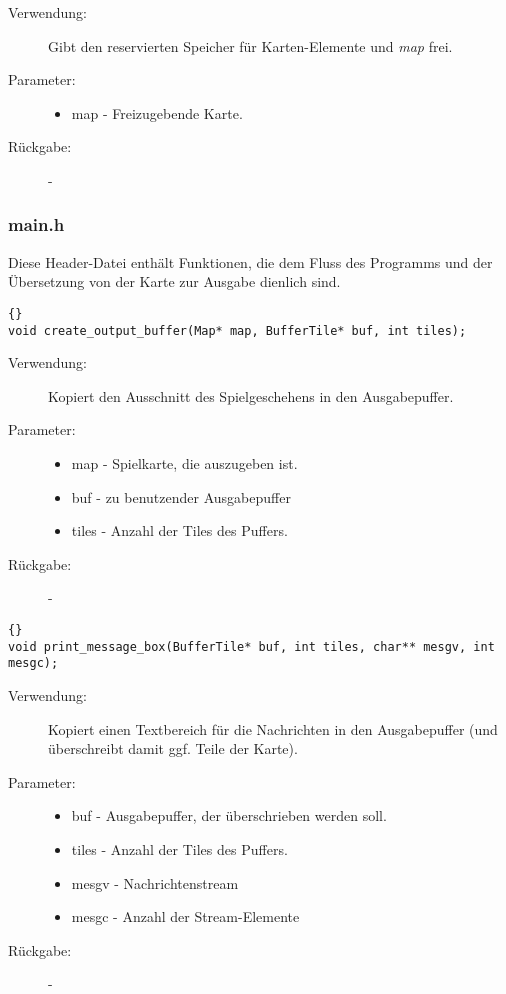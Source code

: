 \documentclass[11pt,a4paper,notitlepage]{report}
\begin{document}
	\begin{description}
		\item[Verwendung:] Gibt den reservierten Speicher für Karten-Elemente und \textit{map} frei.
		\item[Parameter:] \hfill
		\begin{itemize}
			\item map - Freizugebende Karte.
		\end{itemize}
		\item[Rückgabe:] -
	\end{description}
	
	\newpage
	\subsubsection*{main.h}
	Diese Header-Datei enthält Funktionen, die dem Fluss des Programms und der Übersetzung von der Karte zur Ausgabe dienlich sind.
	
		\begin{lstlisting}[caption=create\_output\_buffer]{}
void create_output_buffer(Map* map, BufferTile* buf, int tiles);
		\end{lstlisting}
		
	\begin{description}
		\item[Verwendung:] Kopiert den Ausschnitt des Spielgeschehens in den Ausgabepuffer.
		\item[Parameter:] \hfill
		\begin{itemize}
			\item map - Spielkarte, die auszugeben ist.
			\item buf - zu benutzender Ausgabepuffer
			\item tiles - Anzahl der Tiles des Puffers.
		\end{itemize}
		\item[Rückgabe:] -
	\end{description}
	
		\begin{lstlisting}[caption=print\_message\_box]{}
void print_message_box(BufferTile* buf, int tiles, char** mesgv, int mesgc);
		\end{lstlisting}
		
	\begin{description}
		\item[Verwendung:] Kopiert einen Textbereich für die Nachrichten in den Ausgabepuffer (und überschreibt damit ggf. Teile der Karte).
		\item[Parameter:] \hfill
		\begin{itemize}
			\item buf - Ausgabepuffer, der überschrieben werden soll.
			\item tiles - Anzahl der Tiles des Puffers.
			\item mesgv - Nachrichtenstream
			\item mesgc - Anzahl der Stream-Elemente
		\end{itemize}
		\item[Rückgabe:] -
	\end{description}
	
\end{document}
